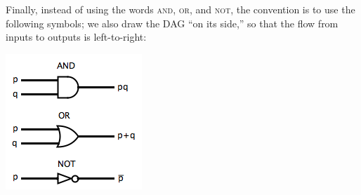 Finally, instead of using the words \textsc{and}, \textsc{or}, and \textsc{not}, the convention is to use the following symbols; we also draw the DAG ``on its side,'' so that the flow from inputs to outputs is left-to-right:
\begin{center}
\includegraphics[width=\linewidth,height=!,scale=0.75]{graphics/AndOrNot.png}
\end{center}

